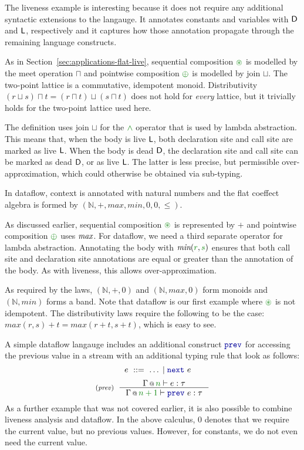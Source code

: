 \noindent
The liveness example is interesting because it does not require any additional syntactic extensions
to the langauge. It annotates constants and variables with $\textnormal{\sffamily D}$ and $\textnormal{\sffamily L}$, respectively
and it captures how those annotation propagate through the remaining language constructs.

As in Section~\ref{sec:applications-flat-live}, sequential composition $\cseq$ is modelled by
the meet operation $\sqcap$ and pointwise composition $\cpar$ is modelled by join $\sqcup$.
The two-point lattice is a commutative, idempotent monoid. Distributivity
$(r \sqcup s) \sqcap t = (r \sqcap t) \sqcup (s \sqcap t)$ does not hold for \emph{every}
lattice, but it trivially holds for the two-point lattice used here.

The definition uses join $\sqcup$ for the $\czip$ operator that is used by lambda abstraction.
This means that, when the body is live $\textnormal{\sffamily L}$, both declaration site and call site are
marked as live $\textnormal{\sffamily L}$. When the body is dead $\textnormal{\sffamily D}$, the declaration site and call site
can be marked as dead $\textnormal{\sffamily D}$, or as live $\textnormal{\sffamily L}$. The latter is less precise, but
permissible over-approximation, which could otherwise be obtained via sub-typing.

\begin{example}[Dataflow]
In dataflow, context is annotated with natural numbers and the flat coeffect algebra is formed
by $(\mathbb{N}, +, \mathit{max}, \mathit{min}, 0, 0, \leq)$.
\end{example}

\noindent
As discussed earlier, sequential composition $\cseq$ is represented by $+$ and pointwise
composition $\cpar$ uses $\emph{max}$. For dataflow, we need a third separate operator for
lambda abstraction. Annotating the body with $\emph{min}(\cclrd{r}, \cclrd{s})$ ensures that
both call site and declaration site annotations are equal or greater than the annotation
of the body. As with liveness, this allows over-approximation.

As required by the laws, $(\mathbb{N}, +, 0)$ and $(\mathbb{N}, \mathit{max}, 0)$ form monoids
and $(\mathbb{N}, \mathit{min})$ forms a band. Note that dataflow is our first example where
$\cseq$ is not idempotent. The distributivity laws require the following to be the case:
$\mathit{max}(r,s) + t = \mathit{max}(r+t, s+t)$, which is easy to see.

A simple dataflow langauge includes an additional construct $\kvd{prev}$ for accessing the
previous value in a stream with an additional typing rule that look as follows:
%
\begin{equation*}
\quad~ e ~::=~ \ldots \sep \kvd{next}~e
\end{equation*}
\begin{equation*}
\tyrule{prev}
  { \coctx{\Gamma}{\cclrd{n}} \vdash e : \tau }
  { \coctx{\Gamma}{\cclrd{n+1}} \vdash \kvd{prev}~e : \tau }
\end{equation*}
%
As a further example that was not covered earlier, it is also possible to combine liveness analysis
and dataflow. In the above calculus, $0$ denotes that we require the current value, but no previous
values. However, for constants, we do not even need the current value.


